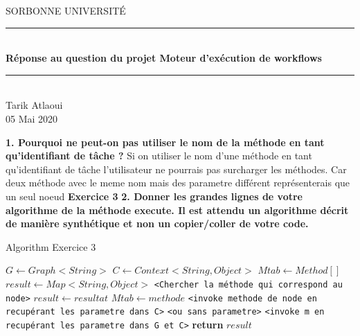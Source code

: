 \documentclass{article}
\date{\today}
\author{Tarik Atlaoui}
\begin{document}
\makeatletter
\def\BState{\State\hskip-\ALG@thistlm}
\makeatother

\begin{titlepage}
	\enlargethispage{2cm}
	\newcommand{\HRule}{\rule{\linewidth}{0.5mm}}
	\center
	\textsc{\LARGE
	SORBONNE UNIVERSITÉ 
	} \\[1cm]
	\HRule \\[0.4cm]
	{ \huge \bfseries Réponse au question du projet Moteur d’exécution de workflows \\[0.15cm] }
	\HRule \\[4cm]
	\large{Tarik Atlaoui} \\[3cm]
	05 Mai 2020 \\[3cm]

\end{titlepage}
                                                                                                                         
\textbf{1. Pourquoi ne peut-on pas utiliser le nom de la méthode en tant qu’identifiant de tâche ?}
\newline
\newline
   Si on utiliser le nom d'une méthode en tant qu'identifiant de tâche l'utilisateur ne pourrais pas surcharger les méthodes.
   Car deux méthode avec le meme nom mais des parametre différent représenterais que un seul noeud
\newline
\newline
\textbf{Exercice 3}
\newline
\textbf{2. Donner les grandes lignes de votre algorithme de la méthode execute. Il est attendu un
algorithme décrit de manière synthétique et non un copier/coller de votre code.}

\begin{algorithm}
  \caption{Algorithm Exercice 3}\label{euclid}
  \begin{algorithmic}[1]
      \State $G\gets Graph<String>$
      \State $C\gets Context<String , Object>$
      \State $Mtab\gets Method[]$
      \State $result\gets Map<String , Object>$
        \State \texttt{<Chercher la méthode qui correspond au node>}      
          \State $result\gets resultat$
          \State $Mtab\gets methode$
        \Else 
        \State \texttt{<invoke methode de node en recupérant les parametre dans C>}
        \State \texttt{<ou sans parametre>}
        \EndIf  
        \EndFor
        \State 
       
        \State \texttt{<invoke m en recupérant les parametre dans G et C>}
      \EndFor
      \State \textbf{return} $result$
    \EndProcedure
  \end{algorithmic}
\end{algorithm}
\end{document}
